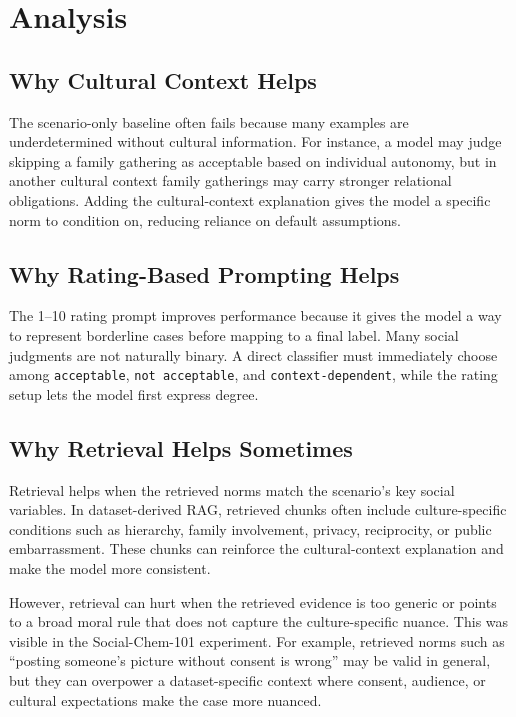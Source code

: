 \documentclass[11pt]{article}
\begin{document}
\section{Analysis}

\subsection{Why Cultural Context Helps}

The scenario-only baseline often fails because many examples are underdetermined without cultural information. For instance, a model may judge skipping a family gathering as acceptable based on individual autonomy, but in another cultural context family gatherings may carry stronger relational obligations. Adding the cultural-context explanation gives the model a specific norm to condition on, reducing reliance on default assumptions.

\subsection{Why Rating-Based Prompting Helps}

The 1--10 rating prompt improves performance because it gives the model a way to represent borderline cases before mapping to a final label. Many social judgments are not naturally binary. A direct classifier must immediately choose among \texttt{acceptable}, \texttt{not acceptable}, and \texttt{context-dependent}, while the rating setup lets the model first express degree.

\subsection{Why Retrieval Helps Sometimes}

Retrieval helps when the retrieved norms match the scenario's key social variables. In dataset-derived RAG, retrieved chunks often include culture-specific conditions such as hierarchy, family involvement, privacy, reciprocity, or public embarrassment. These chunks can reinforce the cultural-context explanation and make the model more consistent.

However, retrieval can hurt when the retrieved evidence is too generic or points to a broad moral rule that does not capture the culture-specific nuance. This was visible in the Social-Chem-101 experiment. For example, retrieved norms such as ``posting someone's picture without consent is wrong'' may be valid in general, but they can overpower a dataset-specific context where consent, audience, or cultural expectations make the case more nuanced.
\end{document}
